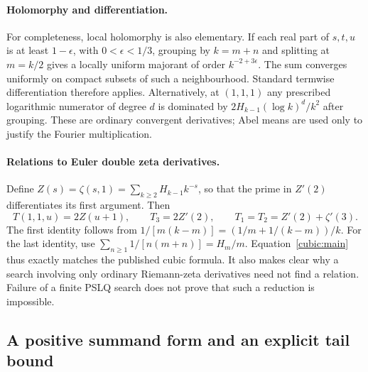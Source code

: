 \paragraph{Holomorphy and differentiation.}
For completeness, local holomorphy is also elementary.  If each real part
of $s,t,u$ is at least $1-\epsilon$, with $0<\epsilon<1/3$, grouping by
$k=m+n$ and splitting at $m=k/2$ gives a locally uniform majorant of order
$k^{-2+3\epsilon}$.  The sum converges uniformly on compact subsets of
such a neighbourhood.  Standard termwise differentiation therefore applies.
Alternatively, at $(1,1,1)$ any prescribed logarithmic numerator of degree
$d$ is dominated by $2H_{k-1}(\log k)^d/k^2$ after grouping.  These are
ordinary convergent derivatives; Abel means are used only to justify the
Fourier multiplication.

\paragraph{Relations to Euler double zeta derivatives.}
Define $Z(s)=\zeta(s,1)=\sum_{k\ge2}H_{k-1}k^{-s}$, so that the prime
in $Z'(2)$ differentiates its first argument.  Then
\begin{equation}\label{cubic:firstpartials}
 T(1,1,u)=2Z(u+1),\qquad
 T_3=2Z'(2),\qquad T_1=T_2=Z'(2)+\zeta'(3).
\end{equation}
The first identity follows from $1/[m(k-m)]=(1/m+1/(k-m))/k$.
For the last identity, use
$\sum_{n\ge1}1/[n(m+n)]=H_m/m$.
Equation~\eqref{cubic:main} thus exactly matches the published cubic formula.
It also makes clear why a search involving only ordinary Riemann-zeta
derivatives need not find a relation.  Failure of a finite PSLQ search
does not prove that such a reduction is impossible.

\subsection{A positive summand form and an explicit tail bound}


